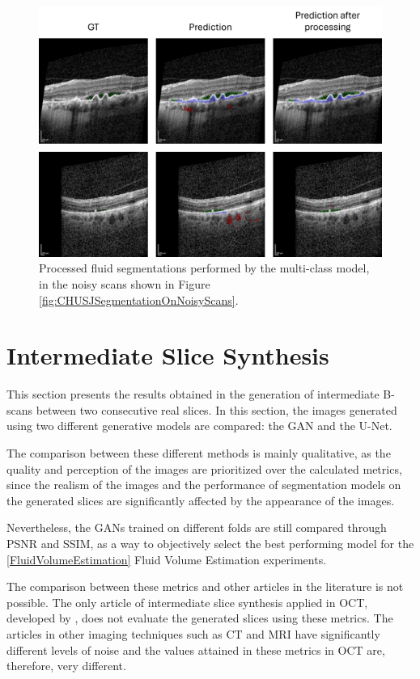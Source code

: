 \begin{figure}[!ht]
	\centering	\includegraphics[width=1.0\linewidth]{figures/CHUSJSegmentationAfterProcessingNoisyScans.png}
	\caption{Processed fluid segmentations performed by the multi-class model, in the noisy scans shown in Figure \ref{fig:CHUSJSegmentationOnNoisyScans}.}
	\label{fig:CHUSJSegmentationAfterProcessingNoisyScans}
\end{figure}

\section{Intermediate Slice Synthesis}\label{IntermediateSliceSynthesis}

This section presents the results obtained in the generation of intermediate B-scans between two consecutive real slices. In this section, the images generated using two different generative models are compared: the GAN and the U-Net.
\par
The comparison between these different methods is mainly qualitative, as the quality and perception of the images are prioritized over the calculated metrics, since the realism of the images and the performance of segmentation models on the generated slices are significantly affected by the appearance of the images.
\par
Nevertheless, the GANs trained on different folds are still compared through PSNR and SSIM, as a way to objectively select the best performing model for the \ref{FluidVolumeEstimation} Fluid Volume Estimation experiments.
\par
The comparison between these metrics and other articles in the literature is not possible. The only article of intermediate slice synthesis applied in OCT, developed by \textcite{Lopez2023}, does not evaluate the generated slices using these metrics. The articles in other imaging techniques such as CT and MRI have significantly different levels of noise and the values attained in these metrics in OCT are, therefore, very different.

